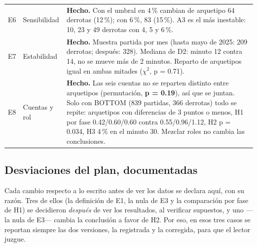 \documentclass[11pt,letterpaper]{article}
\newcommand{\dato}[1]{\textbf{\textcolor{azul}{#1}}}
\begin{document}
\begin{longtable}{p{1.0cm}p{4.2cm}p{9.4cm}}
\addlinespace
E6 & Sensibilidad & \textbf{Hecho.} Con el umbral en 4\,\% cambian de arquetipo 64 derrotas (12\,\%); con 6\,\%, 83 (15\,\%). A3 es el más inestable: 10, 23 y 49 derrotas con 4, 5 y 6\,\%. \\
\addlinespace
E7 & Estabilidad & \textbf{Hecho.} Muestra partida por mes (hasta mayo de 2025: 209 derrotas; después: 328). Mediana de D2: minuto 12 contra 14, no se mueve más de 2 minutos. Reparto de arquetipos igual en ambas mitades (\(\chi^2\), p = 0.71). \\
\addlinespace
E8 & Cuentas y rol & \textbf{Hecho.} Las seis cuentas no se reparten distinto entre arquetipos (permutación, \dato{p = 0.19}), así que se juntan. Solo con BOTTOM (839 partidas, 366 derrotas) todo se repite: arquetipos con diferencias de 3 puntos o menos, H1 por fase 0.42/0.60/0.60 contra 0.55/0.96/1.12, H2 p = 0.034, H3 4\,\% en el minuto 30. Mezclar roles no cambia las conclusiones. \\
\bottomrule
\end{longtable}

\subsection{Desviaciones del plan, documentadas}

Cada cambio respecto a lo escrito antes de ver los datos se declara aquí, con su razón.
Tres de ellos (la definición de E1, la nula de E3 y la comparación por fase de H1) se
decidieron \emph{después} de ver los resultados, al verificar supuestos, y uno ---la nula
de E3--- cambia la conclusión a favor de H2. Por eso, en esos tres casos se reportan
siempre las dos versiones, la registrada y la corregida, para que el lector juzgue.
\end{document}
